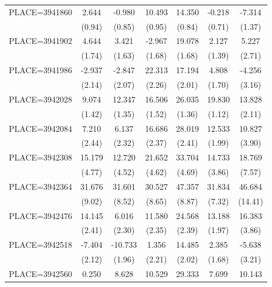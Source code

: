 {\begin{tabular}{l*{6}{c}}
PLACE=3941860       &       2.644&      -0.980&      10.493&      14.350&      -0.218&      -7.314\\
                    &      (0.94)&      (0.85)&      (0.95)&      (0.84)&      (0.71)&      (1.37)\\
PLACE=3941902       &       4.644&       3.421&      -2.967&      19.078&       2.127&       5.227\\
                    &      (1.74)&      (1.63)&      (1.68)&      (1.68)&      (1.39)&      (2.71)\\
PLACE=3941986       &      -2.937&      -2.847&      22.313&      17.194&       4.808&      -4.256\\
                    &      (2.14)&      (2.07)&      (2.26)&      (2.01)&      (1.70)&      (3.16)\\
PLACE=3942028       &       9.074&      12.347&      16.506&      26.035&      19.830&      13.828\\
                    &      (1.42)&      (1.35)&      (1.52)&      (1.36)&      (1.12)&      (2.11)\\
PLACE=3942084       &       7.210&       6.137&      16.686&      28.019&      12.533&      10.827\\
                    &      (2.44)&      (2.32)&      (2.37)&      (2.41)&      (1.99)&      (3.90)\\
PLACE=3942308       &      15.179&      12.720&      21.652&      33.704&      14.733&      18.769\\
                    &      (4.77)&      (4.52)&      (4.62)&      (4.69)&      (3.86)&      (7.57)\\
PLACE=3942364       &      31.676&      31.601&      30.527&      47.357&      31.834&      46.684\\
                    &      (9.02)&      (8.52)&      (8.65)&      (8.87)&      (7.32)&     (14.41)\\
PLACE=3942476       &      14.145&       6.016&      11.580&      24.568&      13.188&      16.383\\
                    &      (2.41)&      (2.30)&      (2.35)&      (2.39)&      (1.97)&      (3.86)\\
PLACE=3942518       &      -7.404&     -10.733&       1.356&      14.485&       2.385&      -5.638\\
                    &      (2.12)&      (1.96)&      (2.21)&      (2.02)&      (1.68)&      (3.21)\\
PLACE=3942560       &       0.250&       8.628&      10.529&      29.333&       7.699&      10.143\\

\end{tabular}}

